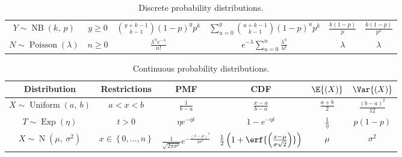 \documentclass{article}
\begin{document}
\begin{table}[H]
\begin{tabular}{c c c c c c}
        \( Y \sim \operatorname{NB}{\left( k,\: p \right)}\)       & \(y \geq 0\)                                           & \(\binom{y + k - 1}{k - 1} \left( 1 - p \right)^y p^k\)   & \(\sum_{u = 0}^y \binom{u + k - 1}{k - 1} \left( 1 - p \right)^u p^k\)   & \(\frac{k\left( 1 - p \right)}{p}\) & \(\frac{k\left( 1 - p \right)}{p^2}\)         \\
        \( N \sim \operatorname{Poisson}{\left( \lambda \right)}\) & \(n \geq 0\)                                           & \(\frac{\lambda^n e^{-\lambda}}{n!}\)                     & \(e^{-\lambda} \sum_{u = 0}^n \frac{\lambda^u}{u!}\)                     & \(\lambda\)                         & \(\lambda\)                                   \\
        \bottomrule
    \end{tabular}
    \caption{Discrete probability distributions.} %
\end{table}
\begin{table}[H]
    \centering
    \begin{tabular}{c c c c c c}
        \toprule
        \textbf{Distribution}                                       & \textbf{Restrictions}                  & \textbf{PMF}                                                                         & \textbf{CDF}                                                                            & \(\E{\left( X \right)}\) & \(\Var{\left( X \right)}\)            \\
        \midrule
        \(X \sim \operatorname{Uniform}{\left( a,\: b \right)}\)    & \(a < x < b\)                          & \(\frac{1}{b - a}\)                                                                  & \(\frac{x - a}{b - a}\)                                                                 & \(\frac{a + b}{2}\)      & \(\frac{\left( b - a \right)^2}{12}\) \\
        \(T \sim \operatorname{Exp}{\left( \eta \right)}\)          & \(t > 0\)                              & \(\eta e^{-\eta t}\)                                                                 & \(1 - e^{-\eta t}\)                                                                     & \(\frac{1}{\eta}\)       & \(p \left( 1 - p \right)\)            \\
        \(X \sim \operatorname{N}{\left( \mu,\: \sigma^2 \right)}\) & \(x \in \left\{ 0, \dots, n \right\}\) & \(\frac{1}{\sqrt{2 \pi \sigma^2}} e^{-\frac{\left( x - \mu \right)^2}{2 \sigma^2}}\) & \(\frac{1}{2} \left( 1 + \erf{\left( \frac{x - \mu}{\sigma \sqrt{2}} \right)} \right)\) & \(\mu\)                  & \(\sigma^2\)                          \\
        \bottomrule
    \end{tabular}
    \caption{Continuous probability distributions.} %
\end{table}
\end{document}
